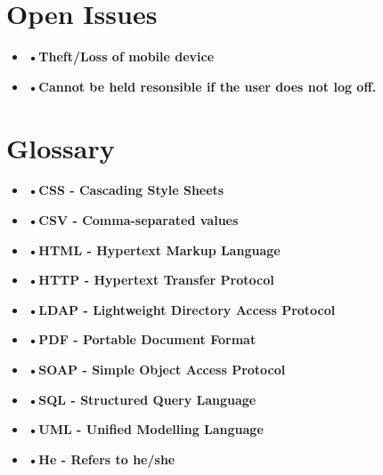 \documentclass[12pt]{article}
\begin{document}
 \section{Open Issues}
\begin{itemize}
  \item \textbf{•Theft/Loss of mobile device}
  \item \textbf{•Cannot be held resonsible if the user does not log off.}
\end{itemize}
 \section{Glossary} 
 \begin{itemize}
  \item \textbf{•CSS - Cascading Style Sheets}
  \item \textbf{•CSV - Comma-separated values}
  \item \textbf{•HTML - Hypertext Markup Language}
  \item \textbf{•HTTP - Hypertext Transfer Protocol}
  \item \textbf{•LDAP - Lightweight Directory Access Protocol}
  \item \textbf{•PDF - Portable Document Format}
  \item \textbf{•SOAP - Simple Object Access Protocol } 
  \item \textbf{•SQL - Structured Query Language}
  \item \textbf{•UML - Unified Modelling Language}
  \item \textbf{•He - Refers to he/she}
\end{itemize}
\end{document}
